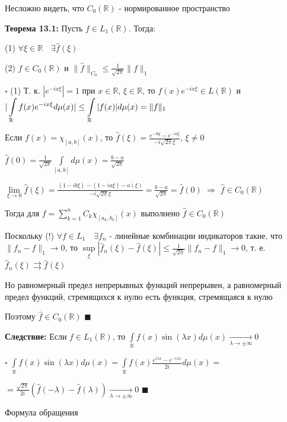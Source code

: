 \documentclass[a4paper]{report}
\newcommand*{\hm}[1]{#1\nobreak\discretionary{}%
            {\hbox{$\mathsurround=0pt #1$}}{}}
\begin{document}
Несложно видеть, что $C_0(\mathbb R)$ - нормированное пространство
\bigskip

\noindent\textbf{Теорема 13.1:} Пусть $f\in L_1(\mathbb R)$. Тогда:

(1) $\forall\xi\in\mathbb R\quad\exists\hat f(\xi)$

(2) $\hat f\in C_0(\mathbb R)$ и $\|\hat f\|_{C_0}\le\frac1{\sqrt{2\pi}}\|f\|_1$

\noindent $\square$ (1) Т. к. $|e^{-ix\xi}|=1$ при $x\in\mathbb R$, $\xi\in\mathbb R$, то $f(x)e^{-ix\xi}\in L(\mathbb R)$ и $|\displaystyle\int\limits_{\mathbb R}f(x)e^{-ix\xi}d\mu(x)|\hm\le\displaystyle\int\limits_{\mathbb R}|f(x)|d\mu(x)=\|f\|_1$

Если $f(x)=\chi_{[a,b]}(x)$, то $\hat f(\xi)=\displaystyle\frac{e^{-ib\xi}-e^{-ia\xi}}{-i\sqrt{2\pi}\xi}$, $\xi\ne0$ 

$\hat f(0)=\displaystyle\frac1{\sqrt{2\pi}}\displaystyle\int\limits_{[a,b]}d\mu(x)=\frac{b-a}{\sqrt{2\pi}}$

$\lim\limits_{\xi\to0}\hat f(\xi)=\displaystyle\frac{(1-ib\xi)-(1-ia\xi)-o(\xi)}{-i\sqrt{2\pi}\xi}=\frac{b-a}{\sqrt{2\pi}}=\hat f(0)$ $\Rightarrow$ $\hat f\in C_0(\mathbb R)$

Тогда для $f=\sum\limits_{k=1}^n C_k\chi_{[a_k,b_k]}(x)$ выполнено $\hat f\in C_0(\mathbb R)$

Поскольку (!) $\forall f\in L_1\quad\exists f_n$ - линейные комбинации индикаторов такие, что $\|f_n-f\|_1\to0$, то $\sup\limits_\xi|\hat f_n(\xi)-\hat f(\xi)|\le\frac1{\sqrt{2\pi}}\|f_n-f\|_1\to0$, т. е. $\hat f_n(\xi)\rightrightarrows\hat f(\xi)$

Но равномерный предел непрерывных функций непрерывен, а равномерный предел функций, стремящихся к нулю есть функция, стремящаяся к нулю


Поэтому $\hat f\in C_0(\mathbb R)$ $\blacksquare$
\bigskip

\noindent\textbf{Следствие:} Если $f\in L_1(\mathbb R)$, то $\displaystyle\int\limits_{\mathbb R}f(x)\sin(\lambda x)d\mu(x)\xrightarrow[\lambda\to\pm\infty]{}0$

\noindent $\square$ $\displaystyle\int\limits_{\mathbb R}f(x)\sin(\lambda x)d\mu(x)=\displaystyle\int\limits_{\mathbb R}f(x)\frac{e^{i\lambda x}-e^{-i\lambda x}}{2i}d\mu(x)=$

\noindent $=\displaystyle\frac{\sqrt{2\pi}}{2i}\left(\hat f(-\lambda)-\hat f(\lambda)\right)\xrightarrow[\lambda\to\pm\infty]{}0$ $\blacksquare$
\bigskip

\noindent Формула обращения
\end{document}
